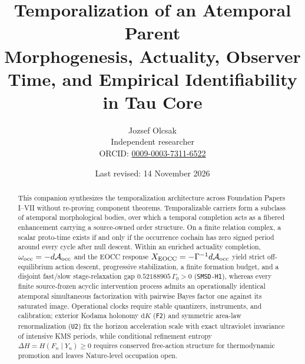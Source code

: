\documentclass[11pt]{article}
\title{\textbf{Temporalization of an Atemporal Parent}\\
\large Morphogenesis, Actuality, Observer Time, and Empirical Identifiability in Tau Core}
\author{Jozsef Olcsak\\\small Independent researcher\\{\small ORCID: \href{https://orcid.org/0009-0003-7311-6522}{0009-0003-7311-6522}}}
\date{Last revised: 14 November 2026}
\begin{document}
\maketitle

\begin{abstract}
This companion synthesizes the temporalization architecture across Foundation Papers I--VII without re-proving component theorems. Temporalizable carriers form a subclass of atemporal morphological bodies, over which a temporal completion acts as a fibered enhancement carrying a source-owned order structure. On a finite relation complex, a scalar proto-time exists if and only if the occurrence cochain has zero signed period around every cycle after null descent. Within an enriched actuality completion, \(\omega_{\rm occ}=-d\mathcal A_{\rm occ}\) and the EOCC response \(X_{\rm EOCC}=-\Gamma^{-1}d\mathcal A_{\rm occ}\) yield strict off-equilibrium action descent, progressive stabilization, a finite formation budget, and a disjoint fast/slow stage-relaxation gap \(0.52188905\,\Gamma_0>0\) (\texttt{SMSD-H1}), whereas every finite source-frozen acyclic intervention process admits an operationally identical atemporal simultaneous factorization with pairwise Bayes factor one against its saturated image. Operational clocks require stable quantizers, instruments, and calibration; exterior Kodama holonomy \(\mathrm{d}K\) (\texttt{F2}) and symmetric area-law renormalization (\texttt{U2}) fix the horizon acceleration scale with exact ultraviolet invariance of intensive KMS periods, while conditional refinement entropy \(\Delta H=H(F_n\mid Y_n)\ge 0\) requires conserved free-action structure for thermodynamic promotion and leaves Nature-level occupation open.
\end{abstract}

\begin{center}
\end{center}
\end{document}
